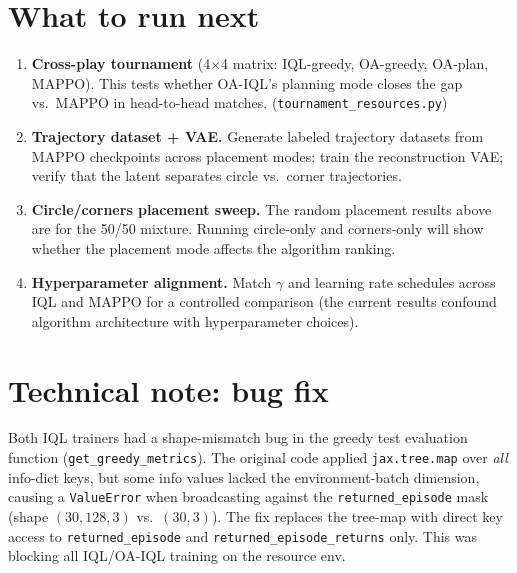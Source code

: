 \documentclass[11pt]{article}
\begin{document}
\section{What to run next}

\begin{enumerate}[nosep]
\item \textbf{Cross-play tournament} (4$\times$4 matrix: IQL-greedy,
  OA-greedy, OA-plan, MAPPO). This tests whether OA-IQL's planning
  mode closes the gap vs.\ MAPPO in head-to-head matches.
  (\texttt{tournament\_resources.py})

\item \textbf{Trajectory dataset + VAE.}  Generate labeled trajectory
  datasets from MAPPO checkpoints across placement modes; train the
  reconstruction VAE; verify that the latent separates circle vs.\
  corner trajectories.

\item \textbf{Circle/corners placement sweep.}  The random placement
  results above are for the 50/50 mixture.  Running circle-only and
  corners-only will show whether the placement mode affects the
  algorithm ranking.

\item \textbf{Hyperparameter alignment.}  Match $\gamma$ and learning
  rate schedules across IQL and MAPPO for a controlled comparison
  (the current results confound algorithm architecture with
  hyperparameter choices).
\end{enumerate}


\section{Technical note: bug fix}

Both IQL trainers had a shape-mismatch bug in the greedy test
evaluation function (\texttt{get\_greedy\_metrics}).  The original code
applied \texttt{jax.tree.map} over \emph{all} info-dict keys, but some
info values lacked the environment-batch dimension, causing a
\texttt{ValueError} when broadcasting against the
\texttt{returned\_episode} mask (shape $(30, 128, 3)$ vs.\
$(30, 3)$).  The fix replaces the tree-map with direct key access to
\texttt{returned\_episode} and \texttt{returned\_episode\_returns}
only.  This was blocking all IQL/OA-IQL training on the resource env.
\end{document}
